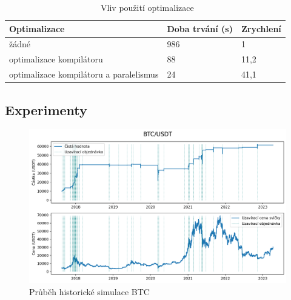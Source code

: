 \begin{table}[!htbp]
\centering
\caption[Vliv použití optimalizace]{~Vliv použití optimalizace}\label{tab:brute:force:optimization}
\begin{tabular}{|l|l|l|}
\hline
\textbf{Optimalizace}                  & \textbf{Doba trvání (s)} & \textbf{Zrychlení} \\ \hline
žádné                                   & 986                      & 1                                                     \\ \hline
optimalizace kompilátoru                & 88                       & 11,2                                                  \\ \hline
optimalizace kompilátoru a paralelismus & 24                       & 41,1                                                   \\ \hline
\end{tabular}
\end{table}

\subsection{Experimenty}


\begin{figure}[htbp]
\centerline{\includegraphics[scale=0.6]{img/btc-historical-simulation.png}}
\caption{Průběh historické simulace BTC}
\label{fig:btc-historical-simulation}
\end{figure}

